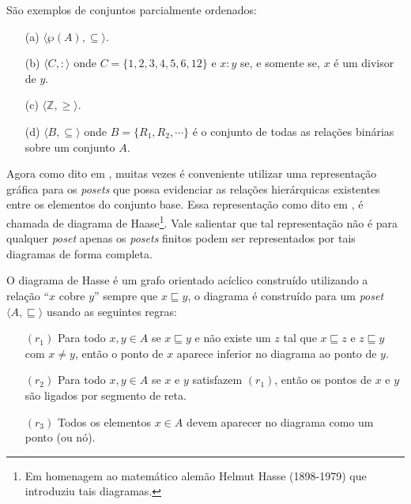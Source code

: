 \begin{example}
	São exemplos de conjuntos parcialmente ordenados:
	\begin{itemize}
		\item[(a)] $\langle \wp(A), \subseteq \rangle$.
		\item[(b)] $\langle C,  : \rangle$ onde $C = \{1, 2, 3, 4, 5, 6, 12\}$ e $x : y$ se, e somente se, $x$ é um divisor de $y$.
		\item[(c)] $\langle \mathbb{Z}, \geq \rangle$.
		\item[(d)] $\langle B, \subseteq \rangle$ onde $B = \{R_1, R_2, \cdots\}$ é o conjunto de todas as relações binárias sobre um conjunto $A$.
	\end{itemize}
\end{example}

Agora como dito em \cite{morgado1962poset}, muitas vezes é conveniente utilizar uma representação gráfica para os \textit{posets} que possa evidenciar as relações hierárquicas existentes entre os elementos do conjunto base. Essa representação como dito em \cite{abe1991-TC}, é chamada de diagrama de Haase\footnote{Em homenagem ao matemático alemão Helmut Hasse (1898-1979) que introduziu tais diagramas.}. Vale salientar que tal representação não é para qualquer \textit{poset} apenas os \textit{posets} finitos podem ser representados por tais diagramas de forma completa.

O diagrama de Hasse é um grafo orientado acíclico construído utilizando a relação ``$x$ cobre $y$'' sempre que $x \sqsubseteq y$, o diagrama é construído para um \textit{poset} $\langle A, \sqsubseteq \rangle$ usando as seguintes regras:

\begin{itemize}
	\item[$(r_1)$] Para todo $x, y \in A$ se $x \sqsubseteq  y$ e não existe um $z$ tal que $x \sqsubseteq  z$ e $z \sqsubseteq  y$ com $x \neq y$, então o ponto de $x$ aparece inferior no diagrama ao ponto de $y$.
	\item[$(r_2)$] Para todo $x, y \in A$ se $x$ e $y$ satisfazem $(r_1)$, então os pontos de $x$ e $y$ são ligados por segmento de reta.
	\item[$(r_3)$] Todos os elementos $x \in A$ devem aparecer no diagrama como um ponto (ou nó).
\end{itemize}

